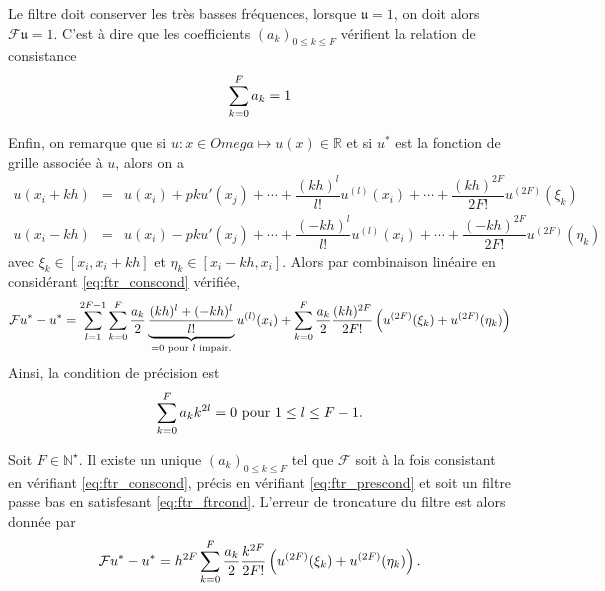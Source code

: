 Le filtre doit conserver les très basses fréquences, lorsque $\mathfrak{u} = \mathfrak{1}$, on doit alors $\mathcal{F}\mathfrak{u} = \mathfrak{1}$.
C'est à dire que les coefficients $(a_k)_{0 \leq k \leq F}$ vérifient la relation de consistance
\begin{equation}
\displaystyle\sum\limits_{k=0}^F a_k = 1
\label{eq:ftr_conscond}
\end{equation}

Enfin, on remarque que si $u : x \in Omega \mapsto u(x) \in \mathbb{R}$ et si $u^*$ est la fonction de grille associée à $u$, alors on a 
\begin{equation}
\begin{array}{rcl}
u(x_i + kh) & = & u(x_i) + p k u'(x_j) + \cdots + \dfrac{(kh)^l}{l!}u^{(l)}(x_i) + \cdots +\dfrac{(kh)^{2F}}{2F!} u^{(2F)}(\xi_k)\\
u(x_i - kh) & = & u(x_i) - p k u'(x_j) + \cdots + \dfrac{(-kh)^l}{l!}u^{(l)}(x_i) + \cdots +\dfrac{(-kh)^{2F}}{2F!} u^{(2F)}(\eta_k)
\end{array}
\end{equation}
avec $\xi_k \in [x_i, x_i+kh]$ et $\eta_k \in [x_i-kh, x_i]$. Alors par combinaison linéaire en considérant \eqref{eq:ftr_conscond} vérifiée, 
\begin{equation}
\mathcal{F}u^* - u^* = \displaystyle\sum\limits_{l=1}^{2F-1} \displaystyle\sum\limits_{k=0}^F \dfrac{a_k}{2} \underbrace{\dfrac{(kh)^l + (-kh)^l}{l!}}_{=0 \text{ pour } l \text{ impair.}}u^{(l)}(x_i) + \displaystyle\sum\limits_{k=0}^F \dfrac{a_k}{2}\dfrac{(kh)^{2F}}{2F!} \left( u^{(2F)}(\xi_k) + u^{(2F)}(\eta_k) \right)
\end{equation}
Ainsi, la condition de précision est 
\begin{equation}
\displaystyle\sum\limits_{k=0}^F a_k k^{2l} = 0 \text{ pour } 1 \leq l \leq F-1.
\label{eq:ftr_prescond}
\end{equation}

\begin{theoreme}
Soit $F \in \mathbb{N}^{\star}$. Il existe un unique $(a_k)_{0 \leq k \leq F}$ tel que $\mathcal{F}$ soit à la fois consistant en vérifiant \eqref{eq:ftr_conscond}, précis en vérifiant \eqref{eq:ftr_prescond} et soit un filtre passe bas en satisfesant \eqref{eq:ftr_ftrcond}. L'erreur de troncature du filtre est alors donnée par 
\begin{equation}
\mathcal{F}u^* - u^* = h^{2F} \displaystyle\sum\limits_{k=0}^F \dfrac{a_k}{2} \dfrac{k^{2F}}{2F!} \left( u^{(2F)}(\xi_k) + u^{(2F)}(\eta_k) \right).
\end{equation}
\end{theoreme}

